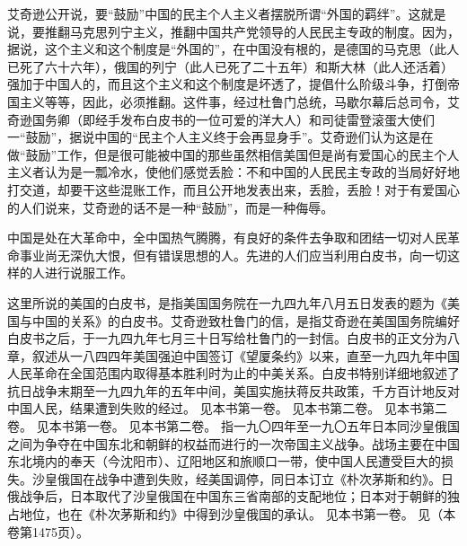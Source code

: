 艾奇逊公开说，要“鼓励”中国的民主个人主义者摆脱所谓“外国的羁绊”。这就是说，要推翻马克思列宁主义，推翻中国共产党领导的人民民主专政的制度。因为，据说，这个主义和这个制度是“外国的”，在中国没有根的，是德国的马克思（此人已死了六十六年），俄国的列宁（此人已死了二十五年）和斯大林（此人还活着）强加于中国人的，而且这个主义和这个制度是坏透了，提倡什么阶级斗争，打倒帝国主义等等，因此，必须推翻。这件事，经过杜鲁门总统，马歇尔幕后总司令，艾奇逊国务卿（即经手发布白皮书的一位可爱的洋大人）和司徒雷登滚蛋大使们一“鼓励”，据说中国的“民主个人主义终于会再显身手”。艾奇逊们认为这是在做“鼓励”工作，但是很可能被中国的那些虽然相信美国但是尚有爱国心的民主个人主义者认为是一瓢冷水，使他们感觉丢脸：不和中国的人民民主专政的当局好好地打交道，却要干这些混账工作，而且公开地发表出来，丢脸，丢脸！对于有爱国心的人们说来，艾奇逊的话不是一种“鼓励”，而是一种侮辱。

中国是处在大革命中，全中国热气腾腾，有良好的条件去争取和团结一切对人民革命事业尚无深仇大恨，但有错误思想的人。先进的人们应当利用白皮书，向一切这样的人进行说服工作。


\begin{maonote}
这里所说的美国的白皮书，是指美国国务院在一九四九年八月五日发表的题为《美国与中国的关系》的白皮书。艾奇逊致杜鲁门的信，是指艾奇逊在美国国务院编好白皮书之后，于一九四九年七月三十日写给杜鲁门的一封信。白皮书的正文分为八章，叙述从一八四四年美国强迫中国签订《望厦条约》以来，直至一九四九年中国人民革命在全国范围内取得基本胜利时为止的中美关系。白皮书特别详细地叙述了抗日战争末期至一九四九年的五年中间，美国实施扶蒋反共政策，千方百计地反对中国人民，结果遭到失败的经过。
见本书第一卷。
见本书第二卷。
见本书第二卷。
见本书第一卷。
见本书第二卷。
指一九〇四年至一九〇五年日本同沙皇俄国之间为争夺在中国东北和朝鲜的权益而进行的一次帝国主义战争。战场主要在中国东北境内的奉天（今沈阳市）、辽阳地区和旅顺口一带，使中国人民遭受巨大的损失。沙皇俄国在战争中遭到失败，经美国调停，同日本订立《朴次茅斯和约》。日俄战争后，日本取代了沙皇俄国在中国东三省南部的支配地位；日本对于朝鲜的独占地位，也在《朴次茅斯和约》中得到沙皇俄国的承认。
见本书第一卷。
见（本卷第1475页）。
\end{maonote}
